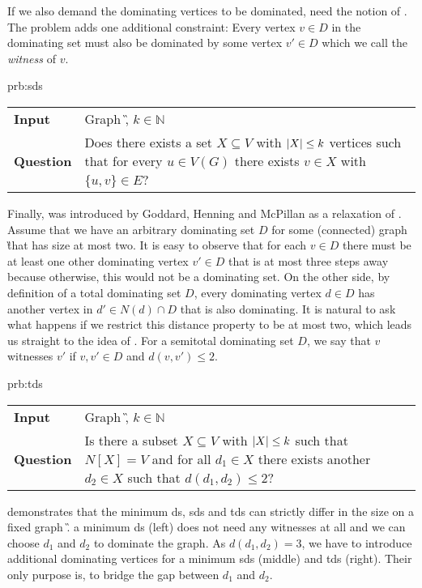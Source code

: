If we also demand the dominating vertices to be dominated, need the notion of \tdomin.
The \tdom problem adds one additional constraint: Every vertex $v \in D$ in the dominating set must also be dominated by some vertex $v' \in D$ which we call the \textit{witness} of $v$.

\begin{prb}{prb:sds}
    \begin{tabularx}{1.0\textwidth}{>{\hsize=0.30\hsize}X>{\hsize=0.8\hsize}X}
        \textbf{Input} & Graph \G, $k \in \mathbb{N}$\\
        \textbf{Question} & Does there exists a set $X \subseteq V$ with $\abs{X}\leq k$ vertices such that for every $u \in V(G)$ there exists $v \in X$ with $\{u,v\} \in E$? \\
    \end{tabularx}
\end{prb}

Finally, \sdomin was introduced by Goddard, Henning and McPillan \cite{Goddard2014} as a relaxation of \tdomin. 
Assume that we have an arbitrary dominating set $D$ for some (connected) graph \G that has size at most two.
It is easy to observe that for each $v \in D$ there must be at least one other dominating vertex $v' \in D$ that is at most three steps away because otherwise, this would not be a dominating set. 
On the other side, by definition of a total dominating set $D$, every dominating vertex $d \in D$ has another vertex in $d' \in N(d) \cap D$ that is also dominating.
It is natural to ask what happens if we restrict this distance property to be at most two, which leads us straight to the idea of \sdomin.
For a semitotal dominating set $D$, we say that $v$ witnesses $v'$ if $v,v' \in D$ and $d(v,v') \leq 2$.

\begin{prb}{prb:tds}
    \begin{tabularx}{1.0\textwidth}{>{\hsize=0.30\hsize}X>{\hsize=0.8\hsize}X}
        \textbf{Input} & Graph \G, $k \in \mathbb{N}$\\
        \textbf{Question} & Is there a subset $X \subseteq V$ with $\abs{X} \leq k$ such that ${N[X] = V}$ and for all $d_1 \in X$ there exists another $d_2 \in X$ such that ${d(d_1, d_2) \leq 2}$?\\
    \end{tabularx}
\end{prb}

 demonstrates that the minimum ds, sds and tds can strictly differ in the size on a fixed graph \G. a minimum ds (left) does not need any witnesses at all and we can choose $d_1$ and $d_2$ to dominate the graph. 
As $d(d_1, d_2) = 3$, we have to introduce additional dominating vertices for a minimum sds (middle) and tds (right). 
Their only purpose is, to bridge the gap between $d_1$ and $d_2$.

